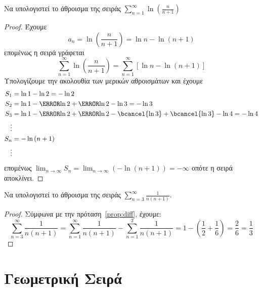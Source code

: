 \begin{examples}
\begin{enumerate}
        \item Να υπολογιστεί το άθροισμα της σειράς $ \sum_{n=1}^{\infty} 
            \ln{\left(\frac{n}{n+1}\right)} $
            \begin{proof}
            \item {}
                Έχουμε
                \[
                    a_{n} = \ln{\left(\frac{n}{n+1}\right)} = \ln{n} - \ln{(n+1)}  
                \]
                επομένως η σειρά γράφεται
                \[
                    \sum_{n=1}^{\infty} \ln{\left(\frac{n}{n+1} \right)} = 
                    \sum_{n=1}^{\infty} [ \ln{n} - \ln{(n+1)} ]
                \] 
                Υπολογίζουμε την ακολουθία των μερικών αθροισμάτων και έχουμε
                \begin{align*}
                  S_{1} &= \ln{1} - \ln{2} = - \ln{2}  \\
                  S_{2} &= \ln{1} - \cancel{\ln{2}} + \cancel{\ln{2}} - \ln{3} 
                  = - \ln{3}  \\
                  S_{3} &= \ln{1} - \cancel{\ln{2}} + \cancel{\ln{2}} -
                  \bcancel{\ln{3}} + \bcancel{\ln{3}} - \ln{4} = - \ln{4} \\
                  \vdots \\
                  S_{n} &= - \ln{(n+1)} \\
                  \vdots
                \end{align*}
                επομένως $ \lim_{n \to \infty} S_{n} = 
                \lim_{n \to \infty} (- \ln{(n+1)}) = - \infty $ οπότε η σειρά αποκλίνει.
            \end{proof}
    \end{enumerate}
\end{examples}


\begin{example}
    Να υπολογιστεί το άθροισμα της σειράς $ \sum_{n=3}^{\infty} \frac{1}{n(n+1)} $.
\end{example}
\begin{proof}
  Σύμφωνα με την πρόταση~\ref{prop:diff}, έχουμε:
    \[
        \sum_{n=3}^{\infty} \frac{1}{n(n+1)} = \sum_{n=1}^{\infty} 
        \frac{1}{n(n+1)} - \sum_{n=1}^{2} \frac{1}{n(n+1)} = 1 - \left(\frac{1}{2} + 
        \frac{1}{6}\right) = \frac{2}{6} = \frac{1}{3}
    \] 
\end{proof}


\section{Γεωμετρική Σειρά}

